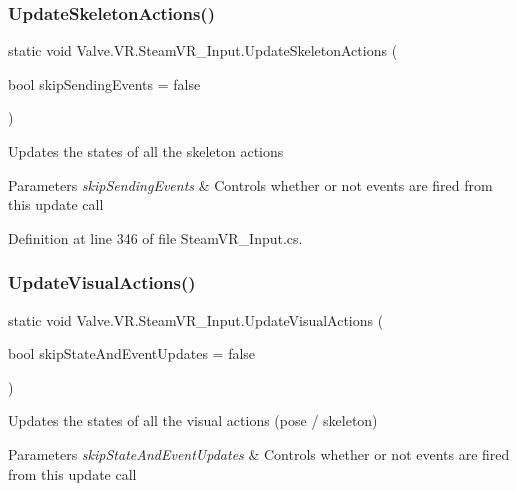 \subsubsection{\texorpdfstring{UpdateSkeletonActions()}{UpdateSkeletonActions()}}
{\footnotesize\ttfamily static void Valve.\+V\+R.\+Steam\+V\+R\+\_\+\+Input.\+Update\+Skeleton\+Actions (\begin{DoxyParamCaption}\item[{bool}]{skip\+Sending\+Events = {\ttfamily false} }\end{DoxyParamCaption})\hspace{0.3cm}{\ttfamily [static]}}



Updates the states of all the skeleton actions 


\begin{DoxyParams}{Parameters}
{\em skip\+Sending\+Events} & Controls whether or not events are fired from this update call\\
\hline
\end{DoxyParams}


Definition at line 346 of file Steam\+V\+R\+\_\+\+Input.\+cs.

\mbox{\label{class_valve_1_1_v_r_1_1_steam_v_r___input_a6e0cac70d4cca2721d8be761b238da4f}} 
\subsubsection{\texorpdfstring{UpdateVisualActions()}{UpdateVisualActions()}}
{\footnotesize\ttfamily static void Valve.\+V\+R.\+Steam\+V\+R\+\_\+\+Input.\+Update\+Visual\+Actions (\begin{DoxyParamCaption}\item[{bool}]{skip\+State\+And\+Event\+Updates = {\ttfamily false} }\end{DoxyParamCaption})\hspace{0.3cm}{\ttfamily [static]}}



Updates the states of all the visual actions (pose / skeleton) 


\begin{DoxyParams}{Parameters}
{\em skip\+State\+And\+Event\+Updates} & Controls whether or not events are fired from this update call\\
\hline
\end{DoxyParams}


